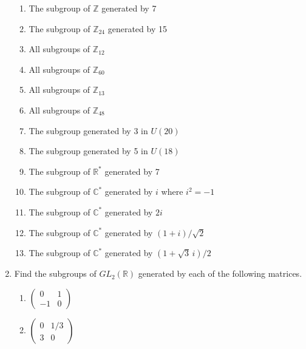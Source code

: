 \documentclass[12pt,reqno]{amsart}
\begin{document}
\begin{enumerate}[{\bf 1.}]
\begin{enumerate}
 \item
The subgroup of ${\mathbb Z}$ generated by 7
 
 \item
The subgroup of ${\mathbb Z}_{24}$ generated by 15
 
 \item
All subgroups of ${\mathbb Z}_{12}$
 
 \item
All subgroups of ${\mathbb Z}_{60}$
 
 \item
All subgroups of ${\mathbb Z}_{13}$
 
 \item
All subgroups of ${\mathbb Z}_{48}$
 
 \item
The subgroup generated by 3  in $U(20)$
 
 \item
The subgroup generated by 5 in $U(18)$  %
 
 \item
The subgroup of ${\mathbb R}^\ast$ generated by 7
 
 \item
The subgroup of ${\mathbb C}^\ast$ generated by $i$ where $i^2 = -1$
 
 \item
The subgroup of ${\mathbb C}^\ast$ generated by $2i$
 
 \item
The subgroup of ${\mathbb C}^\ast$ generated by $(1 + i) / \sqrt{2}$
 
 \item
The subgroup of ${\mathbb C}^\ast$ generated by $(1 + \sqrt{3}\, i) / 2$
 
\end{enumerate}
 
 
\item
Find the subgroups of $GL_2( {\mathbb R })$ generated by each of the
following matrices. 
\begin{multicols}{3}
\begin{enumerate}
 
\item
$\displaystyle
\begin{pmatrix}
0 & 1 \\
-1 & 0
\end{pmatrix}
$

\item
$\displaystyle
\begin{pmatrix}
0 & 1/3 \\
3 & 0
\end{pmatrix}
$


\end{enumerate}
\end{multicols}
\end{enumerate}
\end{document}
